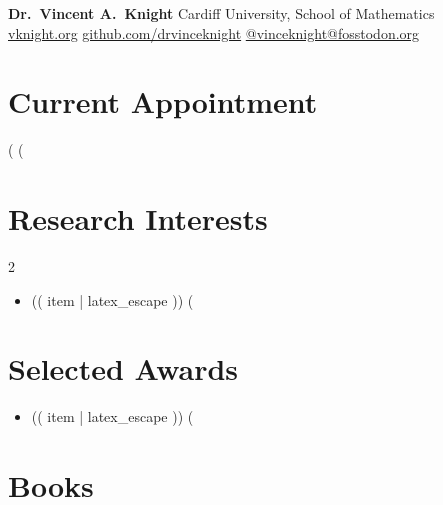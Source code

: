 \documentclass[10pt]{article}
\begin{document}
{\Large \textbf{Dr.\ Vincent A.\ Knight}} \hfill
Cardiff University, School of Mathematics\\
\href{https://vknight.org}{vknight.org} \quad
\href{https://github.com/drvinceknight}{github.com/drvinceknight} \quad
\href{https://fosstodon.org/@vinceknight}{@vinceknight@fosstodon.org}

\medskip

\section{Current Appointment}

(%
(%

\section{Research Interests}

\begin{multicols}{2}
\begin{itemize}
(%
  \item (( item | latex_escape ))
(%
\end{itemize}
\end{multicols}

\section{Selected Awards}

\begin{itemize}
(%
  \item (( item | latex_escape ))
(%
\end{itemize}

\section{Books}
\end{document}
